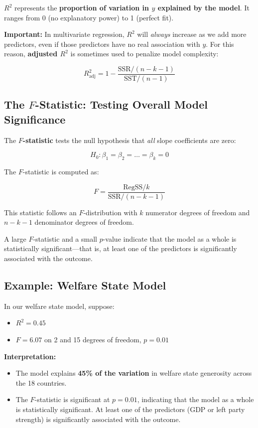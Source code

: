 \documentclass[
  letterpaper,
  DIV=11,
  numbers=noendperiod]{scrreprt}
\providecommand{\tightlist}{%
  \setlength{\itemsep}{0pt}\setlength{\parskip}{0pt}}
\begin{document}
\(R^2\) represents the \textbf{proportion of variation in \(y\)
explained by the model}. It ranges from 0 (no explanatory power) to 1
(perfect fit).

\textbf{Important:} In multivariate regression, \(R^2\) will
\emph{always} increase as we add more predictors, even if those
predictors have no real association with \(y\). For this reason,
\textbf{adjusted \(R^2\)} is sometimes used to penalize model
complexity:

\[
R^2_{\text{adj}} = 1 - \frac{\text{SSR} / (n - k - 1)}{\text{SST} / (n - 1)}
\]

\subsection{\texorpdfstring{The \(F\)-Statistic: Testing Overall Model
Significance}{The F-Statistic: Testing Overall Model Significance}}\label{the-f-statistic-testing-overall-model-significance}

The \textbf{\(F\)-statistic} tests the null hypothesis that \emph{all}
slope coefficients are zero:

\[
H_0: \beta_1 = \beta_2 = \ldots = \beta_k = 0
\]

The \(F\)-statistic is computed as:

\[
F = \frac{\text{RegSS} / k}{\text{SSR} / (n - k - 1)}
\]

This statistic follows an \(F\)-distribution with \(k\) numerator
degrees of freedom and \(n - k - 1\) denominator degrees of freedom.

A large \(F\)-statistic and a small \(p\)-value indicate that the model
as a whole is statistically significant---that is, at least one of the
predictors is significantly associated with the outcome.

\subsection{Example: Welfare State
Model}\label{example-welfare-state-model}

In our welfare state model, suppose:

\begin{itemize}
\tightlist
\item
  \(R^2 = 0.45\)
\item
  \(F = 6.07\) on 2 and 15 degrees of freedom, \(p = 0.01\)
\end{itemize}

\textbf{Interpretation:}

\begin{itemize}
\item
  The model explains \textbf{45\% of the variation} in welfare state
  generosity across the 18 countries.
\item
  The \(F\)-statistic is significant at \(p = 0.01\), indicating that
  the model as a whole is statistically significant. At least one of the
  predictors (GDP or left party strength) is significantly associated
  with the outcome.
\end{itemize}
\end{document}

